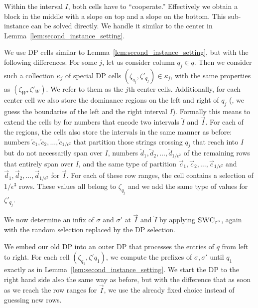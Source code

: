     Within the interval $I$, both cells have to ``cooperate.''
    Effectively we obtain a \BMEC block in the middle with a slope on top and a slope on the bottom. 
    This sub-instance can be solved directly.
    We handle it similar to the center in Lemma~\ref{lem:second_instance_setting}.

    We use DP cells similar to Lemma~\ref{lem:second_instance_setting}, but with the following differences.
    For some $j$, let us consider column $q_j\in q$. Then we consider such a collection $\kappa_j$ of special DP cells $(\zeta_{q_j},\zeta'_{q_j}) \in \kappa_j$, with the same properties as $(\zeta_W,\zeta'_W)$.
    We refer to them as the $j$th center cells.
    Additionally, for each center cell we also store the dominance regions on the left and right of $q_j$ (\ie, we guess the boundaries of the left and the right interval $I$).
    Formally this means to extend the cells by for numbers that encode two intervals $\overleftarrow{I}$ and $\overrightarrow{I}$.
    For each of the regions, the cells also store the intervals in the same manner as before:
    numbers $\overleftarrow{c}_1, \overleftarrow{c}_2, \dotsc, \overleftarrow{c}_{1/\epsilon^2}$
    that partition those strings crossing $q_j$ that reach into $I$ but do not necessarily span over $I$,
    numbers $\overleftarrow{d}_1, \overleftarrow{d}_2, \dotsc, \overleftarrow{d}_{1/\epsilon^2}$
    of the remaining rows that entirely span over $I$, and the same type of partition 
    $\overrightarrow{c}_1, \overrightarrow{c}_2, \dotsc, \overrightarrow{c}_{1/\epsilon^2}$
    and $\overrightarrow{d}_1, \overrightarrow{d}_2, \dotsc, \overrightarrow{d}_{1/\epsilon^2}$
    for $\overrightarrow{I}$.
    For each of these row ranges, the cell contains a selection of $1/\epsilon^3$ rows.
    These values all belong to $\zeta_{q_j}$ and we add the same type of values for $\zeta'_{q_j}$.

    We now determine an infix of $\sigma$ and $\sigma'$ at $\overrightarrow{I}$ and $\overleftarrow{I}$ by applying $\textsc{SWC}_{\varepsilon^3}$, again with the random selection replaced by the DP selection.
    
    We embed our old DP into an outer DP that processes the entries of $q$ from left to right.
    For each cell $(\zeta_{q_1},\zeta'{q_1})$, we compute the prefixes of $\sigma,\sigma'$ until $q_1$ exactly as in Lemma~\ref{lem:second_instance_setting}.
    We start the DP to the right hand side also the same way as before, but with the difference that as soon as we reach the row ranges for $\overrightarrow{I}$, we use the already fixed choice instead of guessing new rows.

